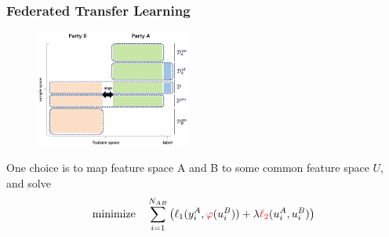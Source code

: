 
\begin{frame}
\frametitle{Federated Transfer Learning}

\begin{figure}
\centering
\includegraphics[width=0.45\textwidth,keepaspectratio]{images/transfer-fl.png}
\end{figure}

One choice \cite{liu_2020_transfer_fl} is to map feature space A and B to some common feature space $U$, and solve
$$
\text{minimize} \quad \sum_{i=1}^{N_{AB}} \left( \ell_1(y_i^A, {\color{red} \varphi}(u_i^B)) + \lambda {\color{red} \ell_2}(u_i^A, u_i^B)  \right)
$$


\end{frame}


